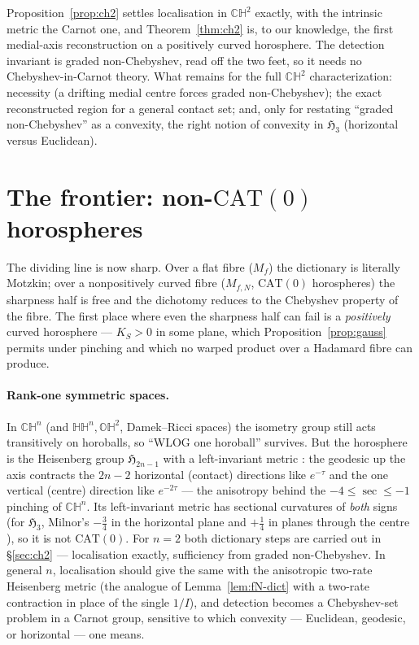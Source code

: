 \documentclass[11pt]{article}
\theoremstyle{remark}
\newcommand{\Mf}{M_{f}}
\begin{document}
Proposition~\ref{prop:ch2} settles localisation in $\mathbb{CH}^{2}$
exactly, with the intrinsic metric the Carnot one, and
Theorem~\ref{thm:ch2} is, to our knowledge, the first medial-axis
reconstruction on a positively curved horosphere. The detection
invariant is graded non-Chebyshev, read off the two feet, so it needs
no Chebyshev-in-Carnot theory. What remains for the full
$\mathbb{CH}^{2}$ characterization: necessity (a drifting medial centre
forces graded non-Chebyshev); the exact reconstructed region for a
general contact set; and, only for restating ``graded non-Chebyshev''
as a convexity, the right notion of convexity in $\mathfrak{H}_{3}$
(horizontal versus Euclidean).

\section{The frontier: non-$\mathrm{CAT}(0)$ horospheres}
\label{sec:frontier}

The dividing line is now sharp. Over a flat fibre ($\Mf$) the
dictionary is literally Motzkin; over a nonpositively curved fibre
($M_{f,N}$, $\mathrm{CAT}(0)$ horospheres) the sharpness half is free
and the dichotomy reduces to the Chebyshev property of the fibre. The
first place where even the sharpness half can fail is a
\emph{positively} curved horosphere --- $K_{S}>0$ in some plane, which
Proposition~\ref{prop:gauss} permits under pinching and which no warped
product over a Hadamard fibre can produce.

\paragraph{Rank-one symmetric spaces.} In $\mathbb{CH}^{n}$ (and
$\mathbb{HH}^{n},\mathbb{OH}^{2}$, Damek--Ricci spaces) the isometry
group still acts transitively on horoballs, so ``WLOG one horoball''
survives. But the horosphere is the Heisenberg group
$\mathfrak{H}_{2n-1}$ with a left-invariant metric \cite{HIH,One,Gol}:
the geodesic up the axis contracts the $2n-2$ horizontal (contact)
directions like $e^{-\tau}$ and the one vertical (centre) direction
like $e^{-2\tau}$ --- the anisotropy behind the $-4\le\sec\le-1$
pinching of $\mathbb{CH}^{n}$. Its left-invariant metric has sectional
curvatures of \emph{both} signs (for $\mathfrak{H}_{3}$, Milnor's
$-\tfrac34$ in the horizontal plane and $+\tfrac14$ in planes through
the centre \cite{Mil}), so it is not $\mathrm{CAT}(0)$. For $n=2$ both
dictionary steps are carried out in \S\ref{sec:ch2} --- localisation
exactly, sufficiency from graded non-Chebyshev. In general $n$,
localisation should give the same with the anisotropic two-rate
Heisenberg metric (the analogue of Lemma~\ref{lem:fN-dict} with a
two-rate contraction in place of the single $1/I$), and detection
becomes a Chebyshev-set problem in a Carnot group, sensitive to which
convexity --- Euclidean, geodesic, or horizontal --- one means.
\end{document}
